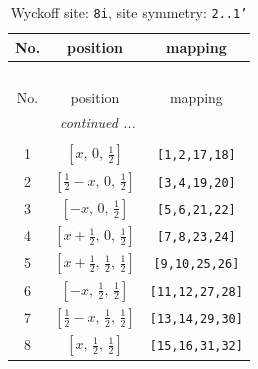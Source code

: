 \documentclass[fleqn,8pt]{jsarticle}
\begin{document}
\renewcommand{\arraystretch}{1.2}
\begin{longtable}{ccc}
\caption{Wyckoff site: {\tt 8i}, site symmetry: {\tt 2..1'}}
 \\
 \hline \hline
No. & position & mapping \\ \hline \endfirsthead

\multicolumn{2}{l}{\tablename\ \thetable{}} \\
 \hline \hline
No. & position & mapping \\ \hline \endhead

 \hline \hline
\multicolumn{2}{r}{\footnotesize\it continued ...} \\ \endfoot

 \hline \hline
\multicolumn{2}{r}{} \\ \endlastfoot

1 & $\left[ x,\, 0,\, \frac{1}{2} \right]$ & {\tt [1,2,17,18]} \\ \hline
2 & $\left[ \frac{1}{2} - x,\, 0,\, \frac{1}{2} \right]$ & {\tt [3,4,19,20]} \\ \hline
3 & $\left[ - x,\, 0,\, \frac{1}{2} \right]$ & {\tt [5,6,21,22]} \\ \hline
4 & $\left[ x + \frac{1}{2},\, 0,\, \frac{1}{2} \right]$ & {\tt [7,8,23,24]} \\ \hline
5 & $\left[ x + \frac{1}{2},\, \frac{1}{2},\, \frac{1}{2} \right]$ & {\tt [9,10,25,26]} \\ \hline
6 & $\left[ - x,\, \frac{1}{2},\, \frac{1}{2} \right]$ & {\tt [11,12,27,28]} \\ \hline
7 & $\left[ \frac{1}{2} - x,\, \frac{1}{2},\, \frac{1}{2} \right]$ & {\tt [13,14,29,30]} \\ \hline
8 & $\left[ x,\, \frac{1}{2},\, \frac{1}{2} \right]$ & {\tt [15,16,31,32]} \\
\end{longtable}
\renewcommand{\arraystretch}{1.2}
\end{document}
